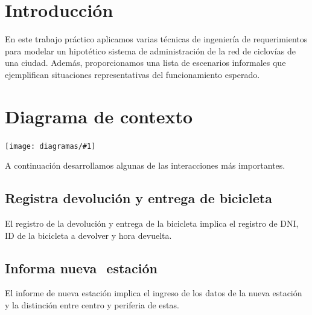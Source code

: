 \documentclass[a4paper, 10pt, twoside]{article}
\newcommand{\diagramah}[1]{
  \texttt{[image: diagramas/\#1]}
}
\begin{document}
\newpage




\tableofcontents

\newpage




\section{Introducción}

En este trabajo práctico aplicamos varias técnicas de ingeniería de requerimientos para modelar un hipotético sistema de administración de la red de ciclovías de una ciudad. Además, proporcionamos una lista de escenarios informales que ejemplifican situaciones representativas del funcionamiento esperado.




\section{Diagrama de contexto}

\diagramah{contexto}

A continuación desarrollamos algunas de las interacciones más importantes.


\subsection{Registra devolución y entrega de bicicleta}
El registro de la devolución y entrega de la bicicleta implica el registro de DNI, ID de la bicicleta a devolver y hora devuelta.


\subsection{Informa nueva  estación}
El informe de nueva estación implica el ingreso de los datos de la nueva estación y la distinción entre centro y periferia de estas.
\end{document}
